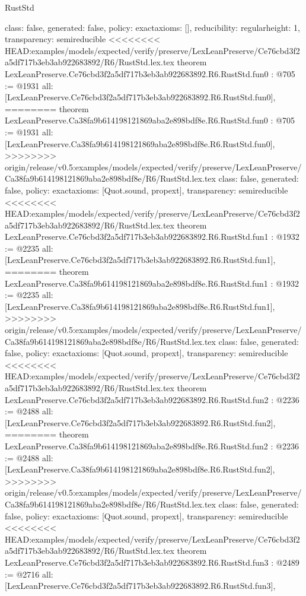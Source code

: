\begin{lexlean}{RustStd}
\begin{coremodule}
{\begin{coremodule}
{{{  class: false,
  generated: false,
  policy: exact{axioms: []},
  reducibility: regular{height: 1},
  transparency: semireducible
}
<<<<<<<< HEAD:examples/models/expected/verify/preserve/LexLeanPreserve/Ce76cbd3f2a5df717b3eb3ab922683892/R6/RustStd.lex.tex
theorem LexLeanPreserve.Ce76cbd3f2a5df717b3eb3ab922683892.R6.RustStd.fun0 : @705 := @1931 {
  all: [LexLeanPreserve.Ce76cbd3f2a5df717b3eb3ab922683892.R6.RustStd.fun0],
========
theorem LexLeanPreserve.Ca38fa9b614198121869aba2e898bdf8e.R6.RustStd.fun0 : @705 := @1931 {
  all: [LexLeanPreserve.Ca38fa9b614198121869aba2e898bdf8e.R6.RustStd.fun0],
>>>>>>>> origin/release/v0.5:examples/models/expected/verify/preserve/LexLeanPreserve/Ca38fa9b614198121869aba2e898bdf8e/R6/RustStd.lex.tex
  class: false,
  generated: false,
  policy: exact{axioms: [Quot.sound, propext]},
  transparency: semireducible
}
<<<<<<<< HEAD:examples/models/expected/verify/preserve/LexLeanPreserve/Ce76cbd3f2a5df717b3eb3ab922683892/R6/RustStd.lex.tex
theorem LexLeanPreserve.Ce76cbd3f2a5df717b3eb3ab922683892.R6.RustStd.fun1 : @1932 := @2235 {
  all: [LexLeanPreserve.Ce76cbd3f2a5df717b3eb3ab922683892.R6.RustStd.fun1],
========
theorem LexLeanPreserve.Ca38fa9b614198121869aba2e898bdf8e.R6.RustStd.fun1 : @1932 := @2235 {
  all: [LexLeanPreserve.Ca38fa9b614198121869aba2e898bdf8e.R6.RustStd.fun1],
>>>>>>>> origin/release/v0.5:examples/models/expected/verify/preserve/LexLeanPreserve/Ca38fa9b614198121869aba2e898bdf8e/R6/RustStd.lex.tex
  class: false,
  generated: false,
  policy: exact{axioms: [Quot.sound, propext]},
  transparency: semireducible
}
<<<<<<<< HEAD:examples/models/expected/verify/preserve/LexLeanPreserve/Ce76cbd3f2a5df717b3eb3ab922683892/R6/RustStd.lex.tex
theorem LexLeanPreserve.Ce76cbd3f2a5df717b3eb3ab922683892.R6.RustStd.fun2 : @2236 := @2488 {
  all: [LexLeanPreserve.Ce76cbd3f2a5df717b3eb3ab922683892.R6.RustStd.fun2],
========
theorem LexLeanPreserve.Ca38fa9b614198121869aba2e898bdf8e.R6.RustStd.fun2 : @2236 := @2488 {
  all: [LexLeanPreserve.Ca38fa9b614198121869aba2e898bdf8e.R6.RustStd.fun2],
>>>>>>>> origin/release/v0.5:examples/models/expected/verify/preserve/LexLeanPreserve/Ca38fa9b614198121869aba2e898bdf8e/R6/RustStd.lex.tex
  class: false,
  generated: false,
  policy: exact{axioms: [Quot.sound, propext]},
  transparency: semireducible
}
<<<<<<<< HEAD:examples/models/expected/verify/preserve/LexLeanPreserve/Ce76cbd3f2a5df717b3eb3ab922683892/R6/RustStd.lex.tex
theorem LexLeanPreserve.Ce76cbd3f2a5df717b3eb3ab922683892.R6.RustStd.fun3 : @2489 := @2716 {
  all: [LexLeanPreserve.Ce76cbd3f2a5df717b3eb3ab922683892.R6.RustStd.fun3],
}}}}}}
\end{coremodule}}
\end{coremodule}
\end{lexlean}
